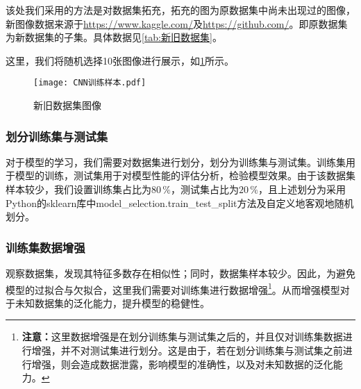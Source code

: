 \documentclass{MathorCupmodeling}
\begin{document}
	该处我们采用的方法是对数据集拓充，拓充的图为原数据集中尚未出现过的图像，新图像数据来源于\url{https://www.kaggle.com/}及\url{https://github.com/}。即原数据集为新数据集的子集。具体数据见\textcolor{blue}{\cref{tab:新旧数据集}}。

\begin{table}[htbp]
	\centering
	\caption{新旧数据集信息}
	\label{tab:新旧数据集}
\end{table}
	这里，我们将随机选择10张图像进行展示，如\textcolor{blue}{\cref{fig:新旧数据集图像}}所示。
	\begin{figure}[H]
		\centering
		\texttt{[image: CNN训练样本.pdf]}
		\caption{新旧数据集图像}
		\label{fig:新旧数据集图像}
	\end{figure}
	\subsubsection{划分训练集与测试集}
	对于模型的学习，我们需要对数据集进行划分，划分为训练集与测试集。训练集用于模型的训练，测试集用于对模型性能的评估分析，检验模型效果。由于该数据集样本较少，我们设置训练集占比为$80\,\%$，测试集占比为$20\,\%$，且上述划分为采用Python的sklearn库中model\_selection.train\_test\_split方法及自定义地客观地随机划分。

	\subsubsection{训练集数据增强}
	观察数据集，发现其特征多数存在相似性；同时，数据集样本较少。因此，为避免模型的过拟合与欠拟合，这里我们需要对训练集进行数据增强\textcolor{blue}{\footnote{\textbf{注意：}这里数据增强是在划分训练集与测试集之后的，并且仅对训练集数据进行增强，并不对测试集进行划分。这是由于，若在划分训练集与测试集之前进行增强，则会造成数据泄露，影响模型的准确性，以及对未知数据的泛化能力。}}。从而增强模型对于未知数据集的泛化能力，提升模型的稳健性。
\end{document}
